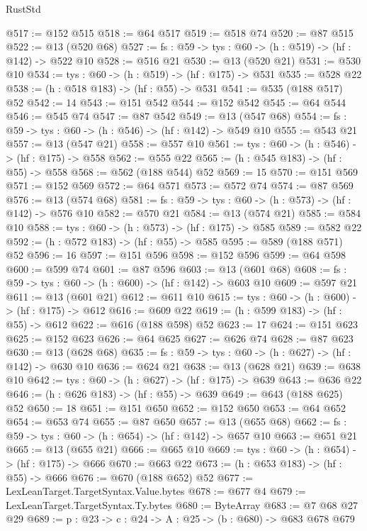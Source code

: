 \begin{lexlean}{RustStd}
\begin{coremodule}
@517 := @152 @515
@518 := @64 @517
@519 := @518 @74
@520 := @87 @515
@522 := @13 (@520 @68)
@527 := {fs : @59} -> {tys : @60} -> (h : @519) -> (hf : @142) -> @522 @10
@528 := @516 @21
@530 := @13 (@520 @21)
@531 := @530 @10
@534 := {tys : @60} -> (h : @519) -> (hf : @175) -> @531
@535 := @528 @22
@538 := (h : @518 @183) -> (hf : @55) -> @531
@541 := @535 (@188 @517) @52
@542 := 14
@543 := @151 @542
@544 := @152 @542
@545 := @64 @544
@546 := @545 @74
@547 := @87 @542
@549 := @13 (@547 @68)
@554 := {fs : @59} -> {tys : @60} -> (h : @546) -> (hf : @142) -> @549 @10
@555 := @543 @21
@557 := @13 (@547 @21)
@558 := @557 @10
@561 := {tys : @60} -> (h : @546) -> (hf : @175) -> @558
@562 := @555 @22
@565 := (h : @545 @183) -> (hf : @55) -> @558
@568 := @562 (@188 @544) @52
@569 := 15
@570 := @151 @569
@571 := @152 @569
@572 := @64 @571
@573 := @572 @74
@574 := @87 @569
@576 := @13 (@574 @68)
@581 := {fs : @59} -> {tys : @60} -> (h : @573) -> (hf : @142) -> @576 @10
@582 := @570 @21
@584 := @13 (@574 @21)
@585 := @584 @10
@588 := {tys : @60} -> (h : @573) -> (hf : @175) -> @585
@589 := @582 @22
@592 := (h : @572 @183) -> (hf : @55) -> @585
@595 := @589 (@188 @571) @52
@596 := 16
@597 := @151 @596
@598 := @152 @596
@599 := @64 @598
@600 := @599 @74
@601 := @87 @596
@603 := @13 (@601 @68)
@608 := {fs : @59} -> {tys : @60} -> (h : @600) -> (hf : @142) -> @603 @10
@609 := @597 @21
@611 := @13 (@601 @21)
@612 := @611 @10
@615 := {tys : @60} -> (h : @600) -> (hf : @175) -> @612
@616 := @609 @22
@619 := (h : @599 @183) -> (hf : @55) -> @612
@622 := @616 (@188 @598) @52
@623 := 17
@624 := @151 @623
@625 := @152 @623
@626 := @64 @625
@627 := @626 @74
@628 := @87 @623
@630 := @13 (@628 @68)
@635 := {fs : @59} -> {tys : @60} -> (h : @627) -> (hf : @142) -> @630 @10
@636 := @624 @21
@638 := @13 (@628 @21)
@639 := @638 @10
@642 := {tys : @60} -> (h : @627) -> (hf : @175) -> @639
@643 := @636 @22
@646 := (h : @626 @183) -> (hf : @55) -> @639
@649 := @643 (@188 @625) @52
@650 := 18
@651 := @151 @650
@652 := @152 @650
@653 := @64 @652
@654 := @653 @74
@655 := @87 @650
@657 := @13 (@655 @68)
@662 := {fs : @59} -> {tys : @60} -> (h : @654) -> (hf : @142) -> @657 @10
@663 := @651 @21
@665 := @13 (@655 @21)
@666 := @665 @10
@669 := {tys : @60} -> (h : @654) -> (hf : @175) -> @666
@670 := @663 @22
@673 := (h : @653 @183) -> (hf : @55) -> @666
@676 := @670 (@188 @652) @52
@677 := LexLeanTarget.TargetSyntax.Value.bytes
@678 := @677 @4
@679 := LexLeanTarget.TargetSyntax.Ty.bytes
@680 := ByteArray
@683 := @7 @68 @27 @29
@689 := {p : @23} -> {c : @24} -> {A : @25} -> (b : @680) -> @683 @678 @679

\end{coremodule}
\end{lexlean}

